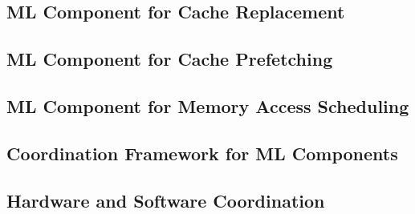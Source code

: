 \subsection{ML Component for Cache Replacement}

\subsection{ML Component for Cache Prefetching}

\subsection{ML Component for Memory Access Scheduling}

\subsection{Coordination Framework for ML Components}

\subsection{Hardware and Software Coordination}

\subsection{}
